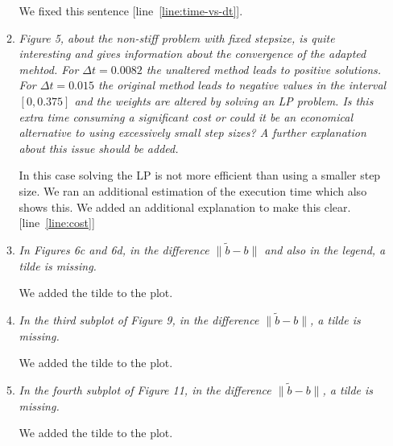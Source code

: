 \documentclass[11pt]{letter}
\begin{document}
\begin{letter}{}
\begin{enumerate}[label=\arabic*.]
\begin{enumerate}[label=\alph*)]
    We fixed this sentence [line~\ref{line:time-vs-dt}].


    \item \emph{%
    Figure 5, about the non-stiff problem with fixed stepsize, is quite interesting
    and gives information about the convergence of the adapted mehtod. For
    $\Delta t = 0.0082$ the unaltered method leads to positive solutions. For
    $\Delta t = 0.015$ the original method leads to negative values in the
    interval $[0, 0.375]$ and the weights are altered by solving an LP problem.
    Is this extra time consuming a significant cost or could it be an economical
    alternative to using excessively small step sizes? A further explanation
    about this issue should be added.
    }

    In this case solving the LP is not more efficient than using a smaller step size. We ran an additional estimation of the execution time which also shows this.
    We added an additional explanation to make this clear. [line~\ref{line:cost}]


    \item \emph{%
    In Figures 6c and 6d, in the difference $\| \tilde b - b \|$ and also in the
    legend, a tilde is missing.
    }

    We added the tilde to the plot.


    \item \emph{%
    In the third subplot of Figure 9, in the difference $\| \tilde b - b \|$,
    a tilde is missing.
    }

    We added the tilde to the plot.


    \item \emph{%
    In the fourth subplot of Figure 11, in the difference $\| \tilde b - b \|$,
    a tilde is missing.
    }

    We added the tilde to the plot.
  \end{enumerate}
\end{enumerate}








\end{letter}
\end{document}
